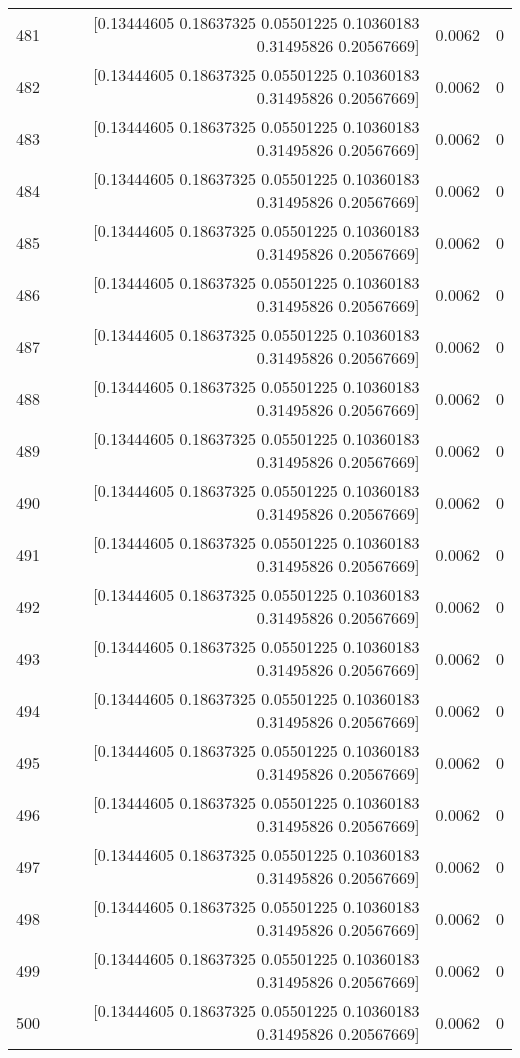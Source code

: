 \begin{longtable}{lrrr}
481 & [0.13444605 0.18637325 0.05501225 0.10360183 0.31495826 0.20567669] & 0.0062 & 0 \\
482 & [0.13444605 0.18637325 0.05501225 0.10360183 0.31495826 0.20567669] & 0.0062 & 0 \\
483 & [0.13444605 0.18637325 0.05501225 0.10360183 0.31495826 0.20567669] & 0.0062 & 0 \\
484 & [0.13444605 0.18637325 0.05501225 0.10360183 0.31495826 0.20567669] & 0.0062 & 0 \\
485 & [0.13444605 0.18637325 0.05501225 0.10360183 0.31495826 0.20567669] & 0.0062 & 0 \\
486 & [0.13444605 0.18637325 0.05501225 0.10360183 0.31495826 0.20567669] & 0.0062 & 0 \\
487 & [0.13444605 0.18637325 0.05501225 0.10360183 0.31495826 0.20567669] & 0.0062 & 0 \\
488 & [0.13444605 0.18637325 0.05501225 0.10360183 0.31495826 0.20567669] & 0.0062 & 0 \\
489 & [0.13444605 0.18637325 0.05501225 0.10360183 0.31495826 0.20567669] & 0.0062 & 0 \\
490 & [0.13444605 0.18637325 0.05501225 0.10360183 0.31495826 0.20567669] & 0.0062 & 0 \\
491 & [0.13444605 0.18637325 0.05501225 0.10360183 0.31495826 0.20567669] & 0.0062 & 0 \\
492 & [0.13444605 0.18637325 0.05501225 0.10360183 0.31495826 0.20567669] & 0.0062 & 0 \\
493 & [0.13444605 0.18637325 0.05501225 0.10360183 0.31495826 0.20567669] & 0.0062 & 0 \\
494 & [0.13444605 0.18637325 0.05501225 0.10360183 0.31495826 0.20567669] & 0.0062 & 0 \\
495 & [0.13444605 0.18637325 0.05501225 0.10360183 0.31495826 0.20567669] & 0.0062 & 0 \\
496 & [0.13444605 0.18637325 0.05501225 0.10360183 0.31495826 0.20567669] & 0.0062 & 0 \\
497 & [0.13444605 0.18637325 0.05501225 0.10360183 0.31495826 0.20567669] & 0.0062 & 0 \\
498 & [0.13444605 0.18637325 0.05501225 0.10360183 0.31495826 0.20567669] & 0.0062 & 0 \\
499 & [0.13444605 0.18637325 0.05501225 0.10360183 0.31495826 0.20567669] & 0.0062 & 0 \\
500 & [0.13444605 0.18637325 0.05501225 0.10360183 0.31495826 0.20567669] & 0.0062 & 0 \\
\end{longtable}